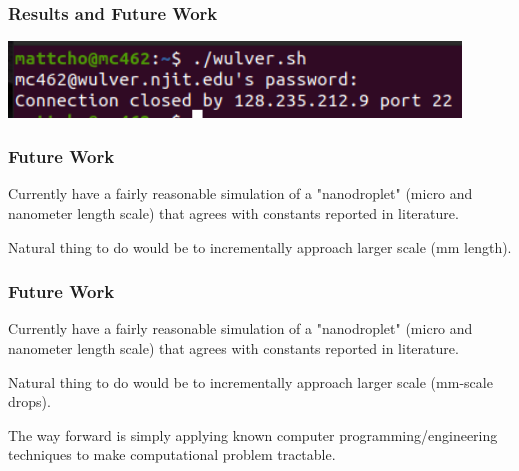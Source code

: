 \documentclass[12pt]{beamer}
\begin{document}
\begin{frame}
    \frametitle{Results and Future Work}
    \includegraphics[width=0.9\textwidth]{img/9-njit.png}
\end{frame}
\begin{frame}
    \frametitle{Future Work}
    Currently have a fairly reasonable simulation of a "nanodroplet" (micro and
    nanometer length scale) that agrees with constants reported in literature.

    Natural thing to do would be to incrementally approach larger scale 
    (mm length).
\end{frame}
\begin{frame}
    \frametitle{Future Work}
    Currently have a fairly reasonable simulation of a "nanodroplet" (micro and
    nanometer length scale) that agrees with constants reported in literature.

    Natural thing to do would be to incrementally approach larger scale 
    (mm-scale drops).

    The way forward is simply applying known computer 
    programming/engineering techniques to make computational problem tractable.
\end{frame}
\end{document}
